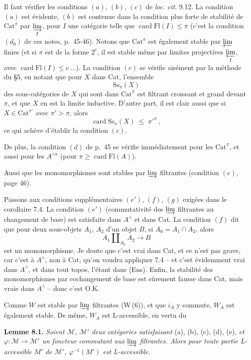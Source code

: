 \documentclass[11pt]{article}
\newcommand{\msp}[1]{\marginpar{\footnotesize [#1]}}
\newcommand{\Fl}{\mathrm{Fl}}
\newcommand{\Cat}{\mathrm{Cat}}
\newcommand{\chap}{^{\wedge}}
\begin{document}
Il faut vérifier les conditions $(a)$, $(b)$, $(c)$ de \textit{loc. cit.} 9.12. La condition $(a)$ est évidente, $(b)$ est contenue dans la condition plus forte de stabilité de $\Cat^{\pi}$ par $\varinjlim\limits_{I}$, pour $I$ une catégorie telle que $\operatorname{card}\Fl(I)\leq\pi$ (c'est la condition $(d_0)$ de ces notes, p.~45-46). Notons que $\Cat^{\pi}$ est également stable par $\varprojlim$ finies (et si $\pi$ est de la forme $2^c$, il est stable même par limites projectives $\varprojlim\limits_{I}$, avec $\operatorname{card}\Fl(I)\leq c\ \ldots$). La condition $(c)$ se vérifie aisément par la méthode du §5, en notant que pour $X$ dans Cat, l'ensemble
\[
\mathrm{Ss}_{\pi}(X)
\]
des sous-catégories de $X$ qui sont dans $\Cat^{\pi}$ est filtrant croissant et grand devant $\pi$, et que $X$ en est la limite inductive. D'autre part, il est clair aussi que si $X\in\Cat^{\pi'}$ avec $\pi'>\pi$, alors
\[
\operatorname{card}\mathrm{Ss}_{\pi}(X) \;\leq\; \pi'^{\pi}\ ,
\]
ce qui achève d'établir la condition $(c)$.

De plus, la condition $(d)$ de p.~45 se vérifie immédiatement pour les $\Cat^{\pi}$, et aussi pour les $A^{\wedge\pi}$ (pour $\pi\geq\operatorname{card}\Fl(A)$).

Aussi que les monomorphismes sont stables par $\varinjlim$ filtrantes (condition $(e)$, page 46).

\msp{page 102}
Passons aux conditions supplémentaires $(e')$, $(f)$, $(g)$ exigées dans le corollaire 7.4. La condition $(e')$ (commutativité des $\varinjlim$ filtrantes au changement de base) est satisfaite dans $A\chap$ et dans Cat. La condition $(f)$ dit que pour deux sous-objets $A_1$, $A_2$ d'un objet $B$, si $A_0=A_1\cap A_2$, alors
\[
A_1\amalg_{A_0}A_2 \longrightarrow B
\]
est un monomorphisme. Je doute que c'est vrai dans Cat, et ce n'est pas grave, car c'est à $A\chap$, non à Cat, qu'on voudra appliquer 7.4 -- et c'est évidemment vrai dans $A\chap$, et dans tout topos, l'étant dans (Ens). Enfin, la stabilité des monomorphismes par cochangement de base est sûrement fausse dans Cat, mais vraie dans $A\chap$ -- donc c'est O.K.

Comme $W$ est stable par $\varinjlim$ filtrantes (W\,(6)), et que $i_A$ y commute, $W_A$ est également stable. De même, $W_A$ est L-accessible, en vertu du

\textbf{Lemme 8.1.} \textit{Soient $\mathcal{M}$, $\mathcal{M}'$ deux catégories satisfaisant} (a), (b), (c), (d), (e), \textit{et $\varphi:\mathcal{M}\longrightarrow\mathcal{M}'$ un foncteur commutant aux $\varinjlim$ filtrantes. Alors pour toute partie L-accessible $M'$ de $\mathcal{M}'$, $\varphi^{-1}(M')$ est L-accessible.}
\end{document}
